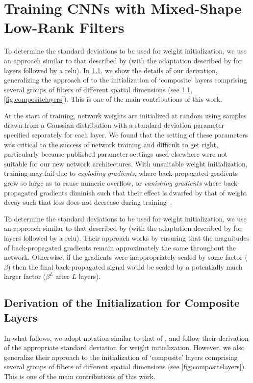 \documentclass[thesis]{subfiles}
\begin{document}
    \section[Training CNNs with Mixed-Shape Low-Rank Filters]{Training CNNs with Mixed-Shape\\Low-Rank Filters}\label{initialization}
    To determine the standard deviations to be used for weight initialization, we use an approach similar to that described by \citet{glorot2010understanding} (with the adaptation described by \citet{He2015b} for layers followed by a \gls{relu}). In \cref{initializationderivation}, we show the details of our derivation, generalizing the approach of \citet{He2015b} to the initialization of `composite' layers comprising several groups of filters of different spatial dimensions (see \cref{initializationderivation}, \cref{fig:compositelayers}). This is one of the main contributions of this work.
    
    At the start of training, network weights are initialized at random using samples drawn from a Gaussian distribution with a standard deviation parameter specified separately for each layer. We found that the setting of these parameters was critical to the success of network training and difficult to get right, particularly because published parameter settings used elsewhere were not suitable for our new network architectures. With unsuitable weight initialization, training may fail due to {\em exploding gradients}, where  back-propagated gradients grow so large as to cause numeric overflow, or {\em vanishing gradients} where back-propagated gradients diminish such that their effect is dwarfed by that of weight decay such that loss does not decrease during training~\citep{Hochreiter01gradientflow}.
    
    To determine the standard deviations to be used for weight initialization, we use an approach similar to that described by \citet{glorot2010understanding} (with the adaptation described by \citet{He2015b} for layers followed by a \gls{relu}). Their approach works by ensuring that the magnitudes of back-propagated gradients remain approximately the same throughout the network. Otherwise, if the gradients were inappropriately scaled by some factor (\eg $\beta$) then the final back-propagated signal would be scaled by a potentially much larger factor ($\beta^L$ after $L$ layers).
    
    \subsection{Derivation of the Initialization for Composite Layers}\label{initializationderivation}
    In what follows, we adopt notation similar to that of \citet{He2015b}, and follow their derivation of the appropriate standard deviation for weight initialization. However, we also generalize their approach to the initialization of `composite' layers comprising several groups of filters of different spatial dimensions (see \cref{fig:compositelayers}). This is one of the main contributions of this work.
    
\end{document}
